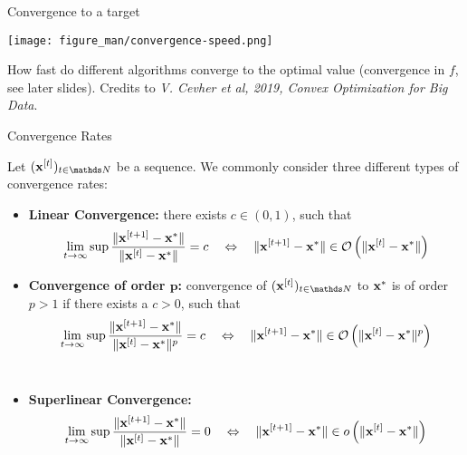 \documentclass[11pt,compress,t,notes=noshow, xcolor=table]{beamer}
\begin{document}
\begin{vbframe}{Convergence to a target}
\framebreak
\vspace*{1cm}
\begin{center}
  \texttt{[image: figure\_man/convergence-speed.png]} \\
  \begin{footnotesize}
    How fast do different algorithms converge to the optimal value (convergence in $f$, see later slides). Credits to \emph{V. Cevher et al, 2019, Convex Optimization for Big Data}.
  \end{footnotesize}
\end{center}

\end{vbframe}

\begin{vbframe}{Convergence Rates} 

Let $(\xv^{[t]})_{t \in\N}$ be a sequence. We commonly consider three different types of convergence rates:%

\begin{itemize}
  \item \textbf{Linear Convergence:}  there exists $c\in(0,1)$, such that
    $$ \lim_{t \rightarrow \infty} \sup\frac{\|\mathbf{x}^{[t+1]}- \mathbf{x}^\ast\|}{\|\mathbf{x}^{[t]}- \mathbf{x}^\ast\|}
        = c\quad \Leftrightarrow \quad\|\mathbf{x}^{[t+1]}- \mathbf{x}^\ast\|\in\mathcal{O}\left(\|\mathbf{x}^{[t]}- \mathbf{x}^\ast\|\right)$$
  \item \textbf{Convergence of order $\bm{p}$:} convergence of $(\xv^{[t]})_{t \in\N}$ to $\mathbf{x}^\ast$ is of order $p>1$ if there exists a $c>0$, such that
    $$ \displaystyle \lim_{t \rightarrow \infty}\sup \frac{\|\mathbf{x}^{[t+1]}- \mathbf{x}^\ast\|}{\|\mathbf{x}^{[t]}- \mathbf{x}^\ast\|^p}
        = c \quad \Leftrightarrow \quad \|\mathbf{x}^{[t+1]}- \mathbf{x}^\ast\|\in\mathcal{O}\left(\|\mathbf{x}^{[t]}- \mathbf{x}^\ast\|^p\right)$$\,\\
\item \textbf{Superlinear Convergence:}
  $$\displaystyle \lim_{t \rightarrow \infty} \sup\frac{\|\mathbf{x}^{[t+1]}- \mathbf{x}^\ast\|}{\|\mathbf{x}^{[t]}- \mathbf{x}^\ast\|} = 0 \quad \Leftrightarrow \quad\|\mathbf{x}^{[t+1]}- \mathbf{x}^\ast\|\in o\left(\|\mathbf{x}^{[t]}- \mathbf{x}^\ast\|\right)$$
\end{itemize}

\begin{comment}
\begin{itemize}
  \item \textbf{Linear Convergence:}  there exists $c\in(0,1)$, such that
    $$ \|\xv^{[t+1]}- \xv^\ast\| \leq c\|\xv^{[t]}-\xv^\ast\| $$


\end{comment}
\end{vbframe}
\end{document}
